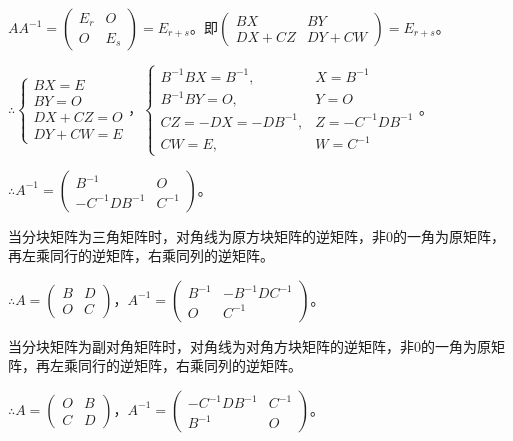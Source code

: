 \documentclass[UTF8, 12pt]{ctexart}
\begin{document}
$AA^{-1}=\left(\begin{array}{cc}
    E_r & O \\
    O & E_s
\end{array}\right)=E_{r+s}$。即$\left(\begin{array}{cc}
    BX & BY \\
    DX+CZ & DY+CW
\end{array}\right)=E_{r+s}$。

$\therefore\left\{\begin{array}{l}
    BX=E \\
    BY=O \\
    DX+CZ=O \\
    DY+CW=E
\end{array}\right.$，$\left\{\begin{array}{ll}
    B^{-1}BX=B^{-1}, & X=B^{-1}\\
    B^{-1}BY=O, & Y=O \\
    CZ=-DX=-DB^{-1}, & Z=-C^{-1}DB^{-1} \\
    CW=E, & W=C^{-1}
\end{array}\right.$。

$\therefore A^{-1}=\left(\begin{array}{cc}
    B^{-1} & O \\
    -C^{-1}DB^{-1} & C^{-1}
\end{array}\right)$。\medskip

当分块矩阵为三角矩阵时，对角线为原方块矩阵的逆矩阵，非0的一角为原矩阵，再左乘同行的逆矩阵，右乘同列的逆矩阵。\medskip

$\therefore A=\left(\begin{array}{cc}
    B & D \\
    O & C
\end{array}\right)$，$A^{-1}=\left(\begin{array}{cc}
    B^{-1} & -B^{-1}DC^{-1} \\
    O & C^{-1}
\end{array}\right)$。\medskip

当分块矩阵为副对角矩阵时，对角线为对角方块矩阵的逆矩阵，非0的一角为原矩阵，再左乘同行的逆矩阵，右乘同列的逆矩阵。\medskip

$\therefore A=\left(\begin{array}{cc}
    O & B \\
    C & D
\end{array}\right)$，$A^{-1}=\left(\begin{array}{cc}
    -C^{-1}DB^{-1} & C^{-1} \\
    B^{-1} & O
\end{array}\right)$。\medskip
\end{document}
